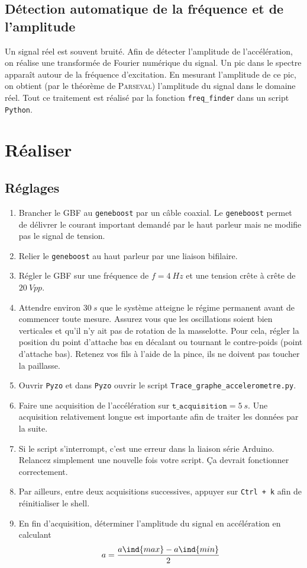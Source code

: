 \documentclass[a4paper, 11pt, final, garamond]{book}
\begin{document}
\subsection{Détection automatique de la fréquence et de l'amplitude}

Un signal réel est souvent bruité. Afin de détecter l'amplitude de
l'accélération, on réalise une transformée de Fourier numérique du signal. Un
pic dans le spectre apparaît autour de la fréquence d'excitation. En mesurant
l'amplitude de ce pic, on obtient (par le théorème de \textsc{Parseval})
l'amplitude du signal dans le domaine réel. Tout ce traitement est réalisé par
la fonction \texttt{freq\_finder} dans un script \texttt{Python}.

\section{Réaliser}

\subsection{Réglages}
\begin{enumerate}
    \item Brancher le GBF au \texttt{geneboost} par un câble coaxial. Le
        \texttt{geneboost} permet de délivrer le courant important demandé par
        le haut parleur mais ne modifie pas le signal de tension. 
    \item Relier le \texttt{geneboost} au haut parleur par une liaison bifilaire. 
    \item Régler le GBF sur une fréquence de $f = \SI{4}{Hz}$ et une tension
        crête à crête de $\SI{20}{Vpp}$.
    \item Attendre environ $\SI{30}{s}$ que le système atteigne le régime
        permanent avant de commencer toute mesure. Assurez vous que les
        oscillations soient bien verticales et qu'il n'y ait pas de rotation de
        la masselotte. Pour cela, régler la position du point d'attache bas en
        décalant ou tournant le contre-poids (point d'attache bas). Retenez vos
        fils à l'aide de la pince, ils ne doivent pas toucher la paillasse. 
    \item Ouvrir \texttt{Pyzo} et dans \texttt{Pyzo} ouvrir le script
        \texttt{Trace\_graphe\_accelerometre.py}.
    \item Faire une acquisition de l'accélération sur $\texttt{t\_acquisition} =
        \SI{5}{s}$. Une acquisition relativement longue est importante afin de
        traiter les données par la suite.
    \item Si le script s'interrompt, c'est une erreur dans la liaison série
        Arduino. Relancez simplement une nouvelle fois votre script. Ça devrait
        fonctionner correctement.
    \item Par ailleurs, entre deux acquisitions successives, appuyer sur
        \texttt{Ctrl + k} afin de réinitialiser le shell.
    \item En fin d'acquisition, déterminer l'amplitude du signal en accélération
        en calculant
        \[
            a = \frac{a\ind{max}-a\ind{min}}{2}
        \]
\end{enumerate}
\end{document}
